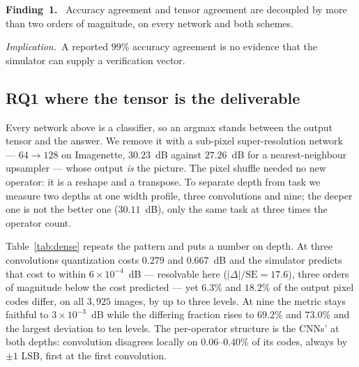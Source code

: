 \documentclass[journal]{IEEEtran}
\newcommand{\finding}[1]{\smallskip\noindent\textbf{Finding~#1.}~}
\newcommand{\implication}{\emph{Implication.}~}
\begin{document}
\finding{1} Accuracy agreement and tensor agreement are decoupled by more than two orders of magnitude, on
every network and both schemes.

\implication A reported $99\%$ accuracy agreement is no evidence that the simulator can supply a
verification vector.

\begin{table}[!t]
\caption{Dense output: ESPCN $\times 2$ on Imagenette, $3{,}925$ images of $49{,}152$ output values each, at two
depths of one width profile. PSNR in dB on $[0,1]$. Quantization itself costs $0.28$--$0.67$~dB at 3 convolutions
and $0.57$--$1.15$~dB at 9, three orders of magnitude more than the simulator-to-integer difference beside it,
while the fraction of differing codes moves with depth by an order of magnitude.}
\label{tab:dense}
\centering
\footnotesize

\end{table}

\subsection{RQ1 where the tensor is the deliverable}
\label{sec:dense}
Every network above is a classifier, so an argmax stands between the output tensor and the answer. We remove it
with a sub-pixel super-resolution network~\cite{espcn} --- $64 \rightarrow 128$ on Imagenette, $30.23$~dB against
$27.26$~dB for a nearest-neighbour upsampler --- whose output \emph{is} the picture. The pixel shuffle needed no
new operator: it is a reshape and a transpose. To separate depth from task we measure two depths at one width
profile, three convolutions and nine; the deeper one is not the better one ($30.11$~dB), only the same task at
three times the operator count.

Table~\ref{tab:dense} repeats the pattern and puts a number on depth. At three convolutions quantization costs
$0.279$ and $0.667$~dB and the simulator predicts that cost to within $6\times10^{-4}$~dB --- resolvable here
($|\Delta|/\mathrm{SE} = 17.6$), three orders of magnitude below the cost predicted --- yet $6.3\%$ and $18.2\%$
of the output pixel codes differ, on all $3{,}925$ images, by up to three levels. At nine the metric stays faithful
to $3\times10^{-3}$~dB while the differing fraction rises to $69.2\%$ and $73.0\%$ and the largest deviation to
ten levels. The per-operator structure is the CNNs' at both depths: convolution disagrees locally on
$0.06$--$0.40\%$ of its codes, always by $\pm 1$ LSB, first at the first convolution.
\end{document}
